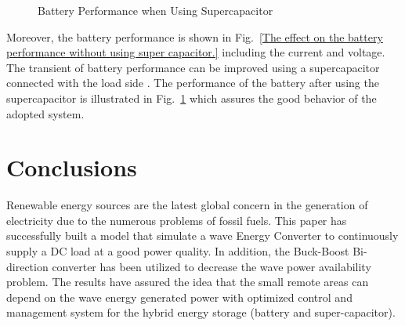 \documentclass[conference]{IEEEtran}
\begin{document}
\begin{figure}[htbp]
	
	
	
	
	\caption{Battery Performance when Using Supercapacitor}
	\label{Battery performance when using supercapacitor}
	
\end{figure}

 
Moreover, the battery performance is shown in Fig.~\ref{The effect on the battery performance without using super capacitor.} including the current and voltage. The transient of battery performance can be improved using a supercapacitor connected with the load side \cite{last}. The performance of the battery after using the supercapacitor is illustrated in Fig.~\ref{Battery performance when using supercapacitor} which assures the good behavior of the adopted system.

\section{Conclusions}

Renewable energy sources are the latest global concern in the generation of electricity due to the numerous problems of fossil fuels. This paper has successfully built a model that simulate a wave Energy Converter to continuously supply a DC load at a good power quality. In addition, the Buck-Boost Bi-direction converter has been utilized to decrease the wave power availability problem. The results have assured the idea that the small remote areas can depend on the wave energy generated power with optimized control and management system for the hybrid energy storage (battery and super-capacitor).



\end{document}
